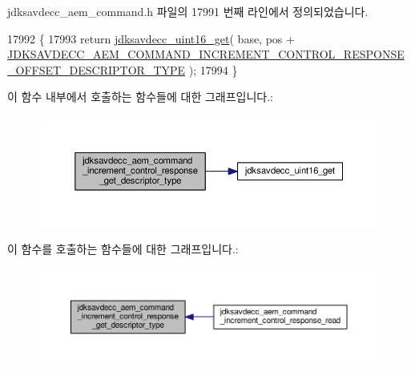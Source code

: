 jdksavdecc\+\_\+aem\+\_\+command.\+h 파일의 17991 번째 라인에서 정의되었습니다.


\begin{DoxyCode}
17992 \{
17993     \textcolor{keywordflow}{return} \hyperlink{group__endian_ga3fbbbc20be954aa61e039872965b0dc9}{jdksavdecc\_uint16\_get}( base, pos + 
      \hyperlink{group__command__increment__control__response_gafc2d89c1261059486507e42c0f8ac92b}{JDKSAVDECC\_AEM\_COMMAND\_INCREMENT\_CONTROL\_RESPONSE\_OFFSET\_DESCRIPTOR\_TYPE}
       );
17994 \}
\end{DoxyCode}


이 함수 내부에서 호출하는 함수들에 대한 그래프입니다.\+:
\nopagebreak
\begin{figure}[H]
\begin{center}
\leavevmode
\includegraphics[width=350pt]{group__command__increment__control__response_ga5e8527c2b1dd2532915b82c65b35b93d_cgraph}
\end{center}
\end{figure}




이 함수를 호출하는 함수들에 대한 그래프입니다.\+:
\nopagebreak
\begin{figure}[H]
\begin{center}
\leavevmode
\includegraphics[width=350pt]{group__command__increment__control__response_ga5e8527c2b1dd2532915b82c65b35b93d_icgraph}
\end{center}
\end{figure}


